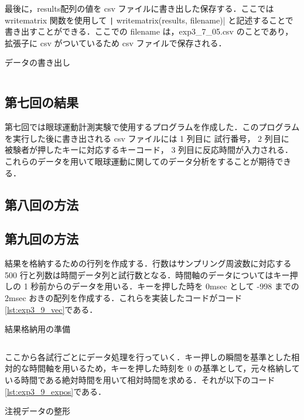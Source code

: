 \documentclass[dvipdfmx, titlepage, t]{jsarticle}
\begin{document}
    最後に，results配列の値を csv ファイルに書き出した保存する．ここでは writematrix 関数を使用して \texttt| writematrix(results, filename)| と記述することで書き出すことができる．ここでの filename は，exp3\_7\_05.csv のことであり，拡張子に csv がついているため csv ファイルで保存される．
        \begin{program}
        \caption{データの書き出し}
        \inputminted[linenos,
        firstline=129,
        lastline=132,
        frame=lines,
        fontsize = \small]{matlab}{code/Exp3_7_Matlab.m}
        \label{lst:exp3_7_write}
    \end{program}


    \subsection{第七回の結果}
    第七回では眼球運動計測実験で使用するプログラムを作成した．このプログラムを実行した後に書き出される csv ファイルには 1 列目に 試行番号， 2 列目に 被験者が押したキーに対応するキーコード， 3 列目に反応時間が入力される．これらのデータを用いて眼球運動に関してのデータ分析をすることが期待できる．

    \subsection{第八回の方法}
    \subsection{第九回の方法}
    結果を格納するための行列を作成する．行数はサンプリング周波数に対応する 500 行と列数は時間データ列と試行数となる．時間軸のデータについてはキー押しの 1 秒前からのデータを用いる．キーを押した時を 0msec として -998 までの 2msec おきの配列を作成する．これらを実装したコードがコード\ref{lst:exp3_9_vec}である．
    
    \begin{program}
        \caption{結果格納用の準備}
        \inputminted[linenos,
        firstline=1,
        lastline=11,
        frame=lines,
        fontsize = \small]{matlab}{code/Exp3_9_Matlab.m}
        \label{lst:exp3_9_vec}
    \end{program}

    ここから各試行ごとにデータ処理を行っていく．キー押しの瞬間を基準とした相対的な時間軸を用いるため，キーを押した時刻を 0 の基準として，元々格納している時間である絶対時間を用いて相対時間を求める．それが以下のコード\ref{lst:exp3_9_expos}である．
    \begin{program}[H]
        \caption{注視データの整形}
        \inputminted[linenos,
        firstline=18,
        lastline=27,
        frame=lines,
        fontsize = \small]{matlab}{code/Exp3_9_Matlab.m}
        \label{lst:exp3_9_expos}
    \end{program}
\end{document}
